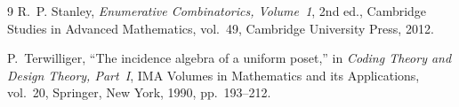 \documentclass[11pt,a4paper]{article}
\theoremstyle{definition}
\theoremstyle{remark}
\begin{document}
\begin{thebibliography}{9}
R.~P. Stanley, \emph{Enumerative Combinatorics, Volume~1}, 2nd ed., Cambridge Studies in Advanced Mathematics, vol.~49, Cambridge University Press, 2012.

P.~Terwilliger, ``The incidence algebra of a uniform poset,'' in \emph{Coding Theory and Design Theory, Part~I}, IMA Volumes in Mathematics and its Applications, vol.~20, Springer, New York, 1990, pp.~193--212.
\end{thebibliography}
\end{document}
